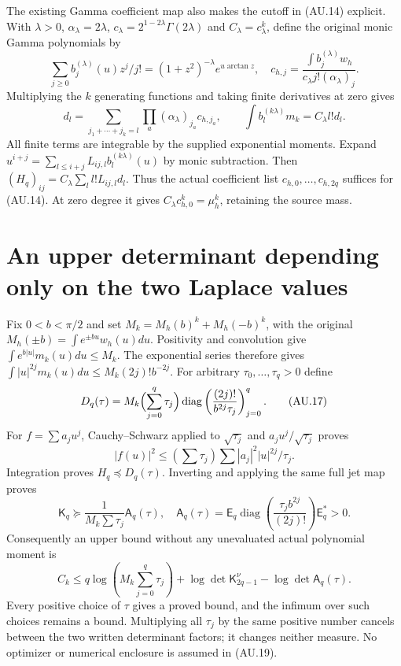 \documentclass[11pt]{article}
\newcommand{\diag}{\operatorname{diag}}
\begin{document}
The existing Gamma coefficient map also makes the cutoff in (AU.14)
explicit. With $\lambda>0$, $\alpha_\lambda=2\lambda$,
$c_\lambda=2^{1-2\lambda}\Gamma(2\lambda)$ and $C_\lambda=c_\lambda^k$,
define the original monic Gamma polynomials by
\[
 \sum_{j\ge0}b_j^{(\lambda)}(u)z^j/j!
 =(1+z^2)^{-\lambda}e^{u\arctan z},\quad
 c_{h,j}=\frac{\int b_j^{(\lambda)}w_h}
 {c_\lambda j!(\alpha_\lambda)_j}.
\]
Multiplying the $k$ generating functions and taking finite derivatives
at zero gives
\[
 d_l=\sum_{j_1+\cdots+j_k=l}\prod_a(\alpha_\lambda)_{j_a}c_{h,j_a},
 \qquad \int b_l^{(k\lambda)}m_k=C_\lambda l!d_l.          \tag{AU.16}
\]
All finite terms are integrable by the supplied exponential moments.
Expand $u^{i+j}=\sum_{l\le i+j}L_{ij,l}b_l^{(k\lambda)}(u)$ by monic
subtraction. Then $(H_q)_{ij}=C_\lambda\sum_l l!L_{ij,l}d_l$.
Thus the actual coefficient list $c_{h,0},\ldots,c_{h,2q}$ suffices
for (AU.14). At zero degree it gives
$C_\lambda c_{h,0}^k=\mu_h^k$, retaining the source mass.

\section{An upper determinant depending only on the two Laplace values}

Fix $0<b<\pi/2$ and set
$M_k=M_h(b)^k+M_h(-b)^k$, with the original
$M_h(\pm b)=\int e^{\pm bu}w_h(u)du$.
Positivity and convolution give $\int e^{b|u|}m_k(u)du\le M_k$.
The exponential series therefore gives
$\int |u|^{2j}m_k(u)du\le M_k(2j)!b^{-2j}$.
For arbitrary $\tau_0,\ldots,\tau_q>0$ define
\[
 D_q(\tau)=M_k\Bigl(\sum_{j=0}^q\tau_j\Bigr)
       \diag\left(\frac{(2j)!}{b^{2j}\tau_j}\right)_{j=0}^q.
 \tag{AU.17}
\]
For $f=\sum a_ju^j$, Cauchy--Schwarz applied to
$\sqrt{\tau_j}$ and $a_ju^j/\sqrt{\tau_j}$ proves
\[
 |f(u)|^2\le(\sum\tau_j)\sum |a_j|^2|u|^{2j}/\tau_j.
\]
Integration proves $H_q\preceq D_q(\tau)$. Inverting and applying
the same full jet map proves
\[
 \mathsf K_q\succeq\frac{1}{M_k\sum\tau_j}\mathsf A_q(\tau),
 \quad
 \mathsf A_q(\tau)=\mathsf E_q
       \diag\left(\frac{\tau_jb^{2j}}{(2j)!}\right)\mathsf E_q^*>0.
 \tag{AU.18}
\]
Consequently an upper bound without any unevaluated actual polynomial
moment is
\[
 \boxed{C_k\le q\log\left(M_k\sum_{j=0}^q\tau_j\right)
  +\log\det\mathsf K_{2q-1}^\nu-\log\det\mathsf A_q(\tau).}
 \tag{AU.19}
\]
Every positive choice of $\tau$ gives a proved bound, and the infimum
over such choices remains a bound. Multiplying all $\tau_j$ by the
same positive number cancels between the two written determinant
factors; it changes neither measure. No optimizer or numerical
enclosure is assumed in (AU.19).
\end{document}
